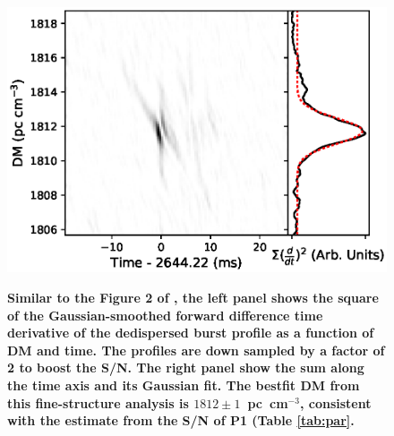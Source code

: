 \begin{figure}%
\centering
\includegraphics[scale=0.7]{DM_struct.eps} \\ 
\caption{\label{fig:DMcurve} 
{\bf Similar to the Figure 2 of \citet{hessels19}, the left panel shows the square of the Gaussian-smoothed forward difference time derivative of the dedispersed burst profile as a function of DM and time. The profiles are down sampled by a factor of 2 to boost the S/N. The right panel show the sum along the time axis and its Gaussian fit. The bestfit DM from this fine-structure analysis is $1812\pm1$~pc~cm$^{-3}$, consistent with the estimate from the S/N of P1 (Table \ref{tab:par}.}
}
\end{figure} 

